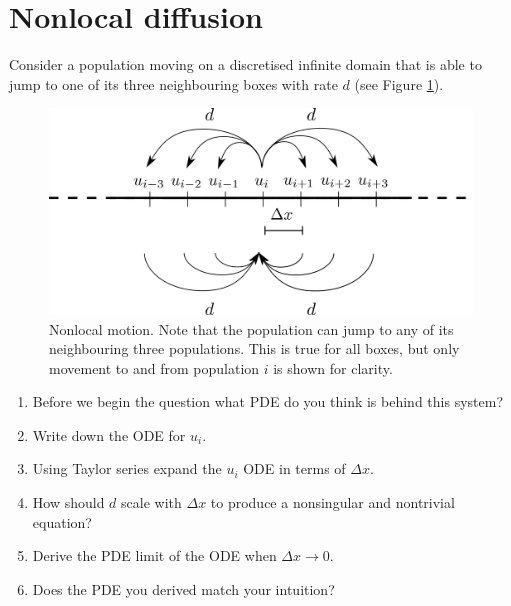 \documentclass[10pt]{article}
\newcommand{\see}[1]{(see Figure \ref{#1})}
\newcommand{\tp}{.8\textwidth}
\begin{document}
\section{Nonlocal diffusion}
Consider a population moving on a discretised infinite domain that is able to jump to one of its three neighbouring boxes with rate $d$ \see{Nonlocal_motion}.
\begin{figure}[h!!!tb]
\centering
\includegraphics[width=\tp]{../../Pictures/Nonlocal_motion.png}
\caption{Nonlocal motion. Note that the population can jump to any of its neighbouring three populations. This is true for all boxes, but only movement to and from population $i$ is shown for clarity. \label{Nonlocal_motion}}
\end{figure}
\begin{enumerate}
\item Before we begin the question what PDE do you think is behind this system?

\item Write down the ODE for $u_i$.

\item Using Taylor series expand the $u_i$ ODE in terms of $\Delta x$.

\item How should $d$ scale with $\Delta x$ to produce a nonsingular and nontrivial equation?

\item Derive the PDE limit of the ODE when $\Delta x \rightarrow 0$.

\item Does the PDE you derived match your intuition?
\end{enumerate}
\end{document}
